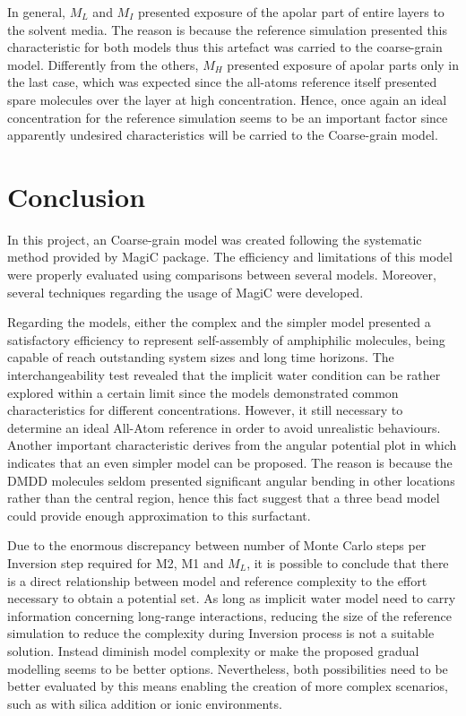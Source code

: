 \documentclass[10pt,a4paper,twoside]{article}
\begin{document}
In general, $M_L$ and $M_I$ presented exposure of the apolar part of entire layers to the solvent media. The reason is because the reference simulation presented this characteristic for both models thus this artefact was carried to the coarse-grain model. Differently from the others, $M_H$ presented exposure of apolar parts only in the last case, which was expected since the all-atoms reference itself presented spare molecules over the layer at high concentration. Hence, once again an ideal concentration for the reference simulation seems to be an important factor since apparently undesired characteristics will be carried to the Coarse-grain model.

\section{Conclusion}
In this  project, an Coarse-grain model was created following the systematic method provided by MagiC package. The efficiency and limitations of this model were properly evaluated using comparisons between several models. Moreover, several techniques regarding the usage of MagiC were developed.

Regarding the models, either the complex and the simpler model presented a satisfactory efficiency to represent self-assembly of amphiphilic molecules, being capable of reach outstanding system sizes and long time horizons. The interchangeability test revealed that the implicit water condition can be rather explored within a certain limit since the models demonstrated common characteristics for different concentrations. However, it still necessary to determine an ideal All-Atom reference in order to avoid unrealistic behaviours. Another important characteristic derives from the angular potential plot in which indicates that an even simpler model can be proposed. The reason is because the DMDD molecules seldom presented significant angular bending in other locations rather than the central region, hence this fact suggest that a three bead model could provide enough approximation to this surfactant.
 
 Due to the enormous discrepancy between number of Monte Carlo steps per Inversion step required for M2, M1 and $M_L$, it is possible to conclude that there is a direct relationship between model and reference complexity to the effort necessary to obtain a potential set. As long as implicit water model need to carry information concerning long-range interactions, reducing the size of the reference simulation to reduce the complexity  during Inversion process is not a suitable solution. Instead diminish model complexity or make the proposed gradual modelling seems to be better options. Nevertheless, both possibilities need to be better evaluated by this means enabling the creation of more complex scenarios, such as with silica addition or ionic environments.
 
\end{document}
